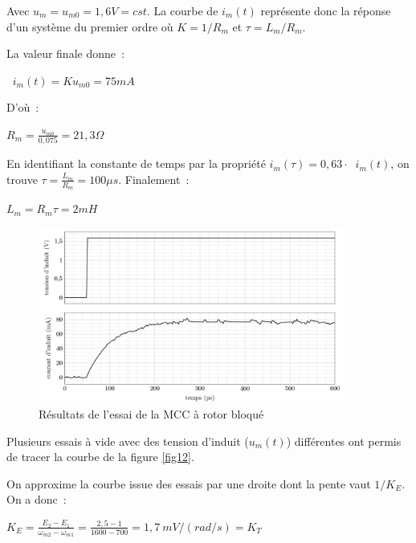 \ifprof
\begin{corrige}
Avec \(u_{m} = u_{m0} = 1,6V = cst\). La courbe de \(i_{m}(t)\)
représente donc la réponse d'un système du premier ordre où
\(K = 1/R_{m}\) et \(\tau = L_{m}/R_{m}\).

La valeur finale donne~:

\(\operatorname{}{i_{m}(t)} = Ku_{m0} = 75mA\)

D'où~:

\(R_{m} = \frac{u_{m0}}{0,075} = 21,3\Omega\)

En identifiant la constante de temps par la propriété
\(i_{m}\left( \tau \right) = 0,63 \cdot \operatorname{}{i_{m}(t)}\), on
trouve \(\tau = \frac{L_{m}}{R_{m}} = 100\mu s\). Finalement~:

\(L_{m} = R_{m}\tau = 2mH\)
\end{corrige}
\else
\fi


\begin{figure}[!htb]
\begin{center}
\includegraphics[width=0.9\textwidth]{images/image_fig9.jpg}
\caption{Résultats de l’essai de la MCC à rotor bloqué \label{fig9}}
\end{center}
\end{figure}


Plusieurs essais à vide avec des tension d'induit ($u_m(t)$) différentes ont permis de tracer la courbe de la
figure \ref{fig12}.

\ifprof
\begin{corrige}
On approxime la courbe issue des essais par une droite dont la pente
  vaut \(1/K_{E}\). On a donc~:


\(K_{E} = \frac{E_{2} - E_{1}}{\omega_{m2} - \omega_{m1}} = \frac{2,5 - 1}{1600 - 700} = 1,7\ mV/(rad/s)=K_T\)
\end{corrige}
\else
\fi


